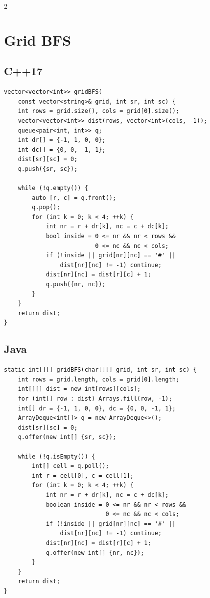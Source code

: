 \documentclass[10pt]{article}
\begin{document}
\begin{multicols}{2}
\section{Grid BFS}
\subsection{C++17}
\begin{framed}
\scriptsize
\begin{verbatim}
vector<vector<int>> gridBFS(
    const vector<string>& grid, int sr, int sc) {
    int rows = grid.size(), cols = grid[0].size();
    vector<vector<int>> dist(rows, vector<int>(cols, -1));
    queue<pair<int, int>> q;
    int dr[] = {-1, 1, 0, 0};
    int dc[] = {0, 0, -1, 1};
    dist[sr][sc] = 0;
    q.push({sr, sc});

    while (!q.empty()) {
        auto [r, c] = q.front();
        q.pop();
        for (int k = 0; k < 4; ++k) {
            int nr = r + dr[k], nc = c + dc[k];
            bool inside = 0 <= nr && nr < rows &&
                          0 <= nc && nc < cols;
            if (!inside || grid[nr][nc] == '#' ||
                dist[nr][nc] != -1) continue;
            dist[nr][nc] = dist[r][c] + 1;
            q.push({nr, nc});
        }
    }
    return dist;
}
\end{verbatim}
\end{framed}

\subsection{Java}
\begin{framed}
\scriptsize
\begin{verbatim}
static int[][] gridBFS(char[][] grid, int sr, int sc) {
    int rows = grid.length, cols = grid[0].length;
    int[][] dist = new int[rows][cols];
    for (int[] row : dist) Arrays.fill(row, -1);
    int[] dr = {-1, 1, 0, 0}, dc = {0, 0, -1, 1};
    ArrayDeque<int[]> q = new ArrayDeque<>();
    dist[sr][sc] = 0;
    q.offer(new int[] {sr, sc});

    while (!q.isEmpty()) {
        int[] cell = q.poll();
        int r = cell[0], c = cell[1];
        for (int k = 0; k < 4; ++k) {
            int nr = r + dr[k], nc = c + dc[k];
            boolean inside = 0 <= nr && nr < rows &&
                             0 <= nc && nc < cols;
            if (!inside || grid[nr][nc] == '#' ||
                dist[nr][nc] != -1) continue;
            dist[nr][nc] = dist[r][c] + 1;
            q.offer(new int[] {nr, nc});
        }
    }
    return dist;
}
\end{verbatim}
\end{framed}

\end{multicols}
\end{document}
